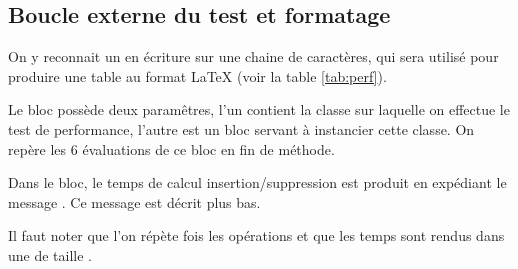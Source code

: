 % 
% 
% 
% 

\subsection{Boucle externe du test et formatage}
On y reconnait un  en \'ecriture sur une chaine de caract\`eres,
qui sera utilis\'e pour produire une table au format LaTeX (voir la table \ref{tab:perf}).

Le bloc  poss\`ede deux param\^etres, l'un contient la classe sur laquelle
on effectue le test de performance, l'autre est un bloc servant \`a instancier cette
classe. On rep\`ere les 6 \'evaluations de ce bloc en fin de m\'ethode.

Dans le bloc, le temps de calcul insertion/suppression est produit en exp\'ediant le
message . Ce message est d\'ecrit plus bas. 

Il faut noter que l'on r\'ep\`ete  fois les op\'erations et que les
temps sont rendus dans une  de taille .

